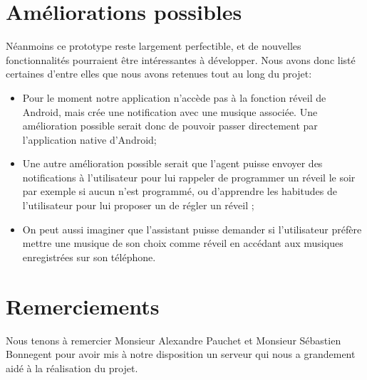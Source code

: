 {\section{Améliorations possibles}
Néanmoins ce prototype reste largement perfectible, et de nouvelles fonctionnalités pourraient être intéressantes à développer. Nous avons donc listé certaines d'entre elles que nous avons retenues tout au long du projet:
\begin{itemize}
	\item Pour le moment notre application n'accède pas à la fonction réveil de Android, mais crée une notification avec une musique associée. Une amélioration possible serait donc de pouvoir passer directement par l'application native d'Android;
	\item Une autre amélioration possible serait que l'agent puisse envoyer des notifications à l'utilisateur pour lui rappeler de programmer un réveil le soir par exemple si aucun n'est programmé, ou d'apprendre les habitudes de l'utilisateur pour lui proposer un de régler un réveil ;
	\item On peut aussi imaginer que l'assistant puisse demander si l'utilisateur préfère mettre une musique de son choix comme réveil en accédant aux musiques enregistrées sur son téléphone.
\end{itemize}
}

\section{Remerciements}

Nous tenons à remercier Monsieur Alexandre Pauchet et Monsieur Sébastien Bonnegent pour avoir mis à notre disposition un serveur qui nous a grandement aidé à la réalisation
du projet.